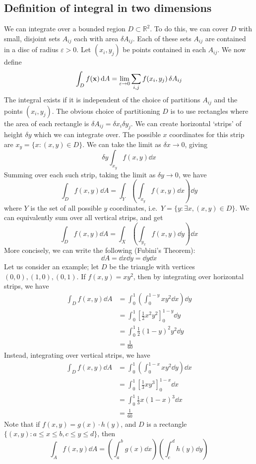 \subsection{Definition of integral in two dimensions}
We can integrate over a bounded region \(D \subset \mathbb R^2\).
To do this, we can cover \(D\) with small, disjoint sets \(A_{ij}\) each with area \(\delta A_{ij}\).
Each of these sets \(A_{ij}\) are contained in a disc of radius \(\varepsilon > 0\).
Let \((x_i, y_j)\) be points contained in each \(A_{ij}\).
We now define
\[
	\int_D f(\vb x) \dd{A} = \lim_{\varepsilon \to 0} \sum_{i, j} f(x_i, y_j) \,\delta A_{ij}
\]
The integral exists if it is independent of the choice of partitions \(A_{ij}\) and the points \((x_i, y_j)\).
The obvious choice of partitioning \(D\) is to use rectangles where the area of each rectangle is \(\delta A_{ij} = \delta x_i \delta y_j\).
We can create horizontal `strips' of height \(\delta y\) which we can integrate over.
The possible \(x\) coordinates for this strip are \(x_y = \{ x \colon (x, y) \in D \}\).
We can take the limit as \(\delta x \to 0\), giving
\[
	\delta y \int_{x_y} f(x, y) \dd{x}
\]
Summing over each such strip, taking the limit as \(\delta y \to 0\), we have
\[
	\int_D f(x, y) \dd{A} = \int_Y \left( \int_{x_y} f(x, y) \dd{x} \right) \dd{y}
\]
where \(Y\) is the set of all possible \(y\) coordinates, i.e.\ \(Y = \{ y \colon \exists x, (x, y) \in D \}\).
We can equivalently sum over all vertical strips, and get
\[
	\int_D f(x, y) \dd{A} = \int_X \left( \int_{y_x} f(x, y) \dd{y} \right) \dd{x}
\]
More concisely, we can write the following (Fubini's Theorem):
\[
	\dd{A} = \dd{x} \dd{y} = \dd{y} \dd{x}
\]
Let us consider an example; let \(D\) be the triangle with vertices \((0, 0), (1, 0), (0, 1)\).
If \(f(x, y) = xy^2\), then by integrating over horizontal strips, we have
\begin{align*}
	\int_D f(x, y) \dd{A} & = \int_0^1 \left( \int_0^{1-y} xy^2 \dd{x} \right) \dd{y}  \\
	                      & = \int_0^1 \left[ \frac{1}{2}x^2y^2 \right]_0^{1-y} \dd{y} \\
	                      & = \int_0^1 \frac{1}{2}(1-y)^2y^2 \dd{y}                    \\
	                      & = \frac{1}{60}
\end{align*}
Instead, integrating over vertical strips, we have
\begin{align*}
	\int_D f(x, y) \dd{A} & = \int_0^1 \left( \int_0^{1-x} xy^2 \dd{y} \right) \dd{x} \\
	                      & = \int_0^1 \left[ \frac{1}{3} xy^3 \right]_0^{1-x} \dd{x} \\
	                      & = \int_0^1 \frac{1}{3} x(1-x)^3 \dd{x}                    \\
	                      & = \frac{1}{60}
\end{align*}
Note that if \(f(x, y) = g(x) \cdot h(y)\), and \(D\) is a rectangle \(\{ (x, y) \colon a \leq x \leq b, c \leq y \leq d \}\), then
\[
	\int_A f(x, y) \dd{A} = \left( \int_a^b g(x) \dd{x} \right)\left( \int_c^d h(y) \dd{y} \right)
\]

